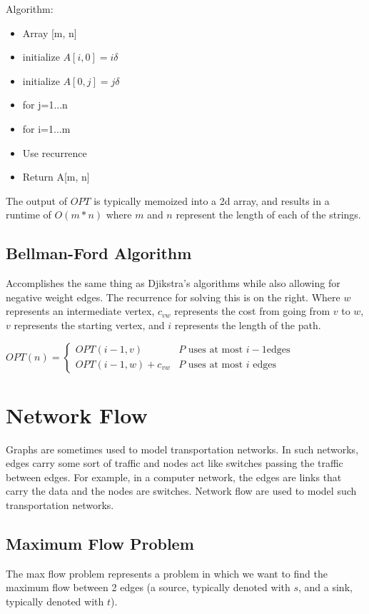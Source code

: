 \documentclass{article}
\begin{document}
Algorithm:
\begin{itemize}
    \item Array [m, n]
    \item initialize $A[i, 0] = i\delta$
    \item initialize $A[0, j] = j\delta$
    \item for j=1...n
    \item \quad for i=1...m
    \item \quad \quad Use recurrence
    \item Return A[m, n]
\end{itemize}

\noindent The output of $OPT$ is typically memoized into a 2d array, and results in a runtime of $O(m * n)$ where $m$ and $n$ represent
the length of each of the strings.

\subsection{Bellman-Ford Algorithm}
\begin{multicols}{2}
Accomplishes the same thing as Djikstra's algorithms while also allowing for negative
weight edges. The recurrence for solving this is on the right.
Where $w$ represents an intermediate vertex, $c_{vw}$ represents the cost from going from $v$ to $w$,
$v$ represents the starting vertex, and $i$ represents the length of the path. 
\columnbreak

$OPT(n) = \begin{cases}
    OPT(i-1, v)  & P \text{ uses at most } i-1 \text{edges} \\
    OPT(i-1, w) + c_{vw} & P \text{ uses at most } i \text{ edges}
  \end{cases}$
\end{multicols}

\section{Network Flow}
Graphs are sometimes used to model transportation networks. In
such networks, edges carry some sort of traffic and nodes act like switches passing the
traffic between edges. For example, in a computer network, the edges are links that carry
the data and the nodes are switches. Network flow are used to model such transportation
networks.

\subsection{Maximum Flow Problem}
The max flow problem represents a problem in which we want to find the maximum flow between
2 edges (a source, typically denoted with $s$, and a sink, typically denoted with $t$). 
\end{document}
